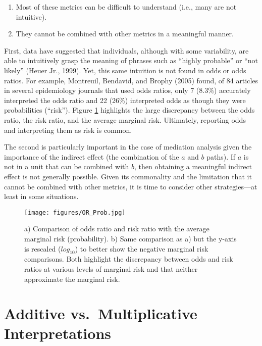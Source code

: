 \documentclass[]{DissertateUSU}
\begin{document}
\begin{enumerate}
\item Most of these metrics can be difficult to understand (i.e., many are not intuitive).
\item They cannot be combined with other metrics in a meaningful manner.
\end{enumerate}

First, data have suggested that individuals, although with some
variability, are able to intuitively grasp the meaning of phrases such
as ``highly probable'' or ``not likely'' (Heuer Jr., 1999). Yet, this
same intuition is not found in odds or odds ratios. For example,
Montreuil, Bendavid, and Brophy (2005) found, of 84 articles in several
epidemiology journals that used odds ratios, only 7 (8.3\%) accurately
interpreted the odds ratio and 22 (26\%) interpreted odds as though they
were probabilities (``risk''). Figure \ref{fig:orprob} highlights the
large discrepancy between the odds ratio, the risk ratio, and the
average marginal risk. Ultimately, reporting odds and interpreting them
as risk is common.

The second is particularly important in the case of mediation analysis
given the importance of the indirect effect (the combination of the
\(a\) and \(b\) paths). If \(a\) is not in a unit that can be combined
with \(b\), then obtaining a meaningful indirect effect is not generally
possible. Given its commonality and the limitation that it cannot be
combined with other metrics, it is time to consider other
strategies---at least in some situations.

\begin{figure}[tb]
  \centering
  \texttt{[image: figures/OR\_Prob.jpg]}
  \caption{a) Comparison of odds ratio and risk ratio with the average marginal risk (probability). b) Same comparison as a) but the y-axis is rescaled ($log_{10}$) to better show the negative marginal risk comparisons. Both highlight the discrepancy between odds and risk ratios at various levels of marginal risk and that neither approximate the marginal risk.}
  \label{fig:orprob}
\end{figure}

\section{Additive vs.~Multiplicative
Interpretations}\label{additive-vs.multiplicative-interpretations}
\end{document}
